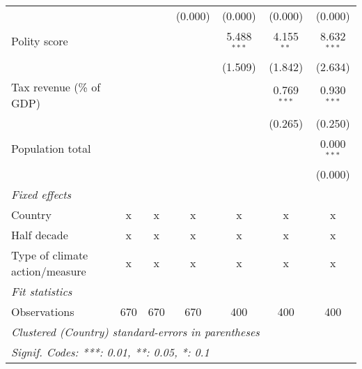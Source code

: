 \begin{tabular}{lcccccc}
                                                                      &                &                & (0.000)        & (0.000)        & (0.000)        & (0.000)\\   
   Polity score                                                       &                &                &                & 5.488$^{***}$  & 4.155$^{**}$   & 8.632$^{***}$\\   
                                                                      &                &                &                & (1.509)        & (1.842)        & (2.634)\\   
   Tax revenue (\% of GDP)                                            &                &                &                &                & 0.769$^{***}$  & 0.930$^{***}$\\   
                                                                      &                &                &                &                & (0.265)        & (0.250)\\   
   Population total                                                   &                &                &                &                &                & 0.000$^{***}$\\   
                                                                      &                &                &                &                &                & (0.000)\\   
   \emph{Fixed effects}\\
   Country                                                            & x              & x              & x              & x              & x              & x\\  
   Half decade                                                        & x              & x              & x              & x              & x              & x\\  
   Type of climate action/measure                                     & x              & x              & x              & x              & x              & x\\  
   \midrule \emph{Fit statistics}\\
   Observations                                                       & 670            & 670            & 670            & 400            & 400            & 400\\  
   \midrule
   \multicolumn{7}{l}{\emph{Clustered (Country) standard-errors in parentheses}}\\
   \multicolumn{7}{l}{\emph{Signif. Codes: ***: 0.01, **: 0.05, *: 0.1}}\\
\end{tabular}
\par\endgroup


